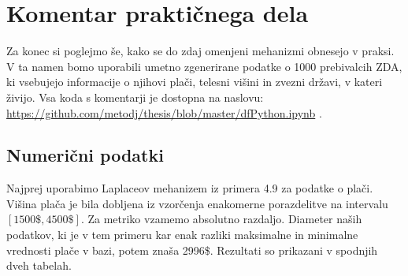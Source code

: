 \documentclass[12pt,a4paper]{amsart}
\theoremstyle{definition} %
\theoremstyle{plain} %
\begin{document}
\section{Komentar praktičnega dela}

Za konec si poglejmo še, kako se do zdaj omenjeni mehanizmi obnesejo v praksi. V ta namen bomo uporabili umetno zgenerirane podatke o 1000 prebivalcih ZDA, ki vsebujejo informacije o njihovi plači, telesni višini in zvezni državi, v kateri živijo. Vsa koda s komentarji je dostopna na naslovu: \url{https://github.com/metodj/thesis/blob/master/dfPython.ipynb} .
\subsection{Numerični podatki}
Najprej uporabimo Laplaceov mehanizem iz primera 4.9 za podatke o plači. Višina plača je bila dobljena iz vzorčenja enakomerne porazdelitve na intervalu $[1500\$,4500\$]$. Za metriko vzamemo absolutno razdaljo. Diameter naših podatkov, ki je v tem primeru kar enak razliki maksimalne in minimalne vrednosti plače v bazi, potem znaša 2996\$. Rezultati so prikazani v spodnjih dveh tabelah.
\end{document}
